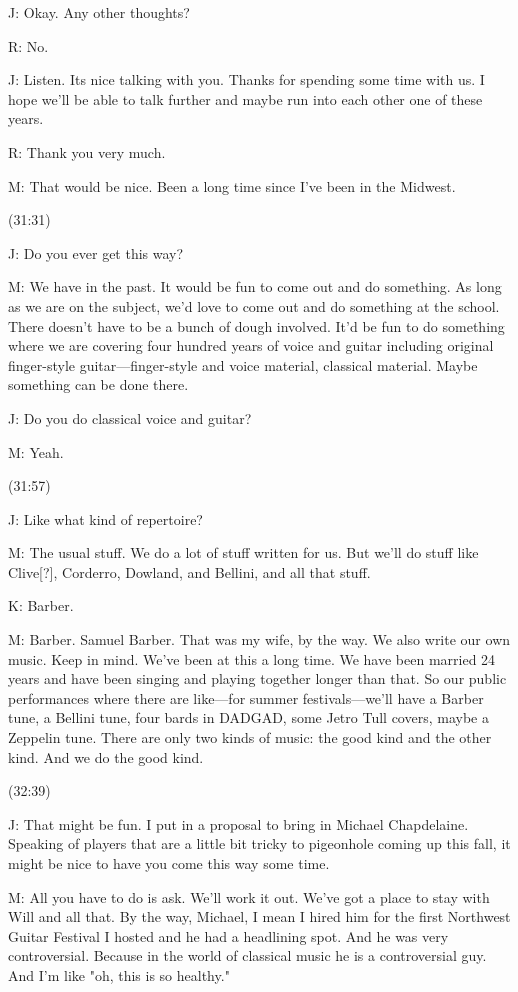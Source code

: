 \documentclass[11pt]{article}
\begin{document}
J: Okay. Any other thoughts?

R: No. 

J: Listen. Its nice talking with you. Thanks for spending some time with us. I hope we'll be able to talk further and maybe run into each other one of these years.

R: Thank you very much.

M: That would be nice. Been a long time since I've been in the Midwest.

(31:31)

J: Do you ever get this way? 

M: We have in the past. It would be fun to come out and do something. As long as we are on the subject, we'd love to come out and do something at the school. There doesn't have to be a bunch of dough involved. It'd be fun to do something where we are covering four hundred years of voice and guitar including original finger-style guitar—finger-style and voice material, classical material. Maybe something can be done there.

J: Do you do classical voice and guitar?

M: Yeah.

(31:57) 

J: Like what kind of repertoire?

M: The usual stuff. We do a lot of stuff written for us. But we'll do stuff like Clive[?], Corderro, Dowland, and Bellini, and all that stuff.

K: Barber.

M: Barber. Samuel Barber. That was my wife, by the way. We also write our own music. Keep in mind. We've been at this a long time. We have been married 24 years and have been singing and playing together longer than that. So our public performances where there are like—for summer festivals—we'll have a Barber tune, a Bellini tune, four bards in DADGAD, some Jetro Tull covers, maybe a Zeppelin tune. There are only two kinds of music: the good kind and the other kind. And we do the good kind. 

(32:39)

J: That might be fun. I put in a proposal to bring in Michael Chapdelaine. Speaking of players that are a little bit tricky to pigeonhole coming up this fall, it might be nice to have you come this way some time. 

M: All you have to do is ask. We'll work it out. We've got a place to stay with Will and all that. By the way, Michael, I mean I hired him for the first Northwest Guitar Festival I hosted and he had a headlining spot. And he was very controversial. Because in the world of classical music he is a controversial guy. And I'm like "oh, this is so healthy."
\end{document}

